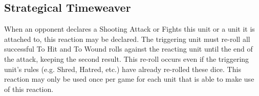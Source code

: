\subsection{Strategical Timeweaver} \label{Strategical Timeweaver}

When an opponent declares a Shooting Attack or Fights this unit or a unit it is attached to, this reaction may be declared. The triggering unit must re-roll all successful To Hit and To Wound rolls against the reacting unit until the end of the attack, keeping the second result. This re-roll occurs even if the triggering unit's rules (e.g. Shred, Hatred, etc.) have already re-rolled these dice. This reaction may only be used once per game for each unit that is able to make use of this reaction.

